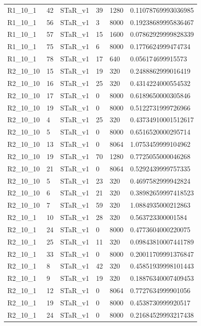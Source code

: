 \begin{tabular}{llllll}
 R1\_10\_1 & 42 & STaR\_v1 & 39 & 1280 & 0.11078769993036985 \\
 R1\_10\_1 & 56 & STaR\_v1 & 3 & 8000 & 0.19238689995836467 \\
 R1\_10\_1 & 57 & STaR\_v1 & 15 & 1600 & 0.07862929999828339 \\
 R1\_10\_1 & 75 & STaR\_v1 & 6 & 8000 & 0.1776624999474734 \\
 R1\_10\_1 & 78 & STaR\_v1 & 17 & 640 & 0.056174699915573 \\
 R2\_10\_10 & 15 & STaR\_v1 & 19 & 320 & 0.2488862999016419 \\
 R2\_10\_10 & 16 & STaR\_v1 & 25 & 320 & 0.4314224000554532 \\
 R2\_10\_10 & 17 & STaR\_v1 & 0 & 8000 & 0.6189650000305846 \\
 R2\_10\_10 & 19 & STaR\_v1 & 0 & 8000 & 0.5122731999726966 \\
 R2\_10\_10 & 4 & STaR\_v1 & 25 & 320 & 0.43734910001512617 \\
 R2\_10\_10 & 5 & STaR\_v1 & 0 & 8000 & 0.6516520000295714 \\
 R2\_10\_10 & 13 & STaR\_v1 & 0 & 8064 & 1.0753459999104962 \\
 R2\_10\_10 & 19 & STaR\_v1 & 70 & 1280 & 0.7725055000046268 \\
 R2\_10\_10 & 21 & STaR\_v1 & 0 & 8064 & 0.5292439999757335 \\
 R2\_10\_10 & 5 & STaR\_v1 & 23 & 320 & 0.4697582999942824 \\
 R2\_10\_10 & 6 & STaR\_v1 & 21 & 320 & 0.38982659997418523 \\
 R2\_10\_10 & 7 & STaR\_v1 & 59 & 320 & 1.0884935000212863 \\
 R2\_10\_1 & 10 & STaR\_v1 & 28 & 320 & 0.563723300001584 \\
 R2\_10\_1 & 24 & STaR\_v1 & 0 & 8000 & 0.4773604000220075 \\
 R2\_10\_1 & 25 & STaR\_v1 & 11 & 320 & 0.09843810007441789 \\
 R2\_10\_1 & 33 & STaR\_v1 & 0 & 8000 & 0.20011709991376847 \\
 R2\_10\_1 & 8 & STaR\_v1 & 42 & 320 & 0.45851939998101443 \\
 R2\_10\_1 & 9 & STaR\_v1 & 19 & 320 & 0.18876340007409453 \\
 R2\_10\_1 & 12 & STaR\_v1 & 0 & 8064 & 0.7727634999901056 \\
 R2\_10\_1 & 19 & STaR\_v1 & 0 & 8000 & 0.4538730999920517 \\
 R2\_10\_1 & 24 & STaR\_v1 & 0 & 8000 & 0.21684529993217438 \\

\end{tabular}
